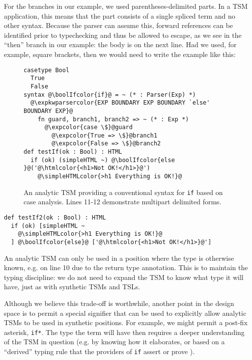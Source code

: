 \documentclass{sig-alternate}[10pt]
\newcommand{\htmlcolor}[1]{\textcolor[HTML]{339933}{#1}}
\newcommand{\expkwparsercolor}[1]{\textcolor[HTML]{336699}{#1}}
\newcommand{\expcolor}[1]{\textcolor[HTML]{FF0033}{#1}}
\newcommand{\simpleHTMLcolor}[1]{\textcolor[HTML]{7D5100}{#1}}
\newcommand{\boolIfcolor}[1]{\textcolor[HTML]{CD7300}{#1}}
\newcommand{\mycaption}[1]{\vspace{-10px}\caption{#1}\vspace{-8px}}
\newcommand{\lstinlinew}[1]{\lstinline[style=wyvern]{#1}}
\begin{document}
For the branches in our example, we used parentheses-delimited parts. In a TSM application, this means that the part consists of a single spliced term and no other syntax. Because the parser can assume this, forward references can be identified prior to typechecking and thus be allowed to escape, as we see in the ``then'' branch in our example: the body is on the next line. Had we used, for example, square brackets, then we would need to write the example like this:


\begin{figure}[t]
\begin{lstlisting}[style=wyvern]
casetype Bool
  True
  False
syntax @\boolIfcolor{if}@ = ~ (* : Parser(Exp) *)
  @\expkwparsercolor{EXP BOUNDARY EXP BOUNDARY `else' BOUNDARY EXP}@
    fn guard, branch1, branch2 => ~ (* : Exp *)
      @\expcolor{case \$}@guard
        @\expcolor{True => \$}@branch1
        @\expcolor{False => \$}@branch2
def testIf(ok : Bool) : HTML
  if (ok) (simpleHTML ~) @\boolIfcolor{else }@('@\htmlcolor{<h1>Not OK!</h1>}@')
    @\simpleHTMLcolor{>h1 Everything is OK!}@
\end{lstlisting}
\mycaption{An analytic TSM providing a conventional syntax for \texttt{if} based on case analysis. Lines 11-12 demonstrate multipart delimited forms.}
\label{if-example}
\end{figure}
\begin{lstlisting}[style=wyvern,numbers=none,frame=none]
def testIf2(ok : Bool) : HTML
  if (ok) [simpleHTML ~
    @\simpleHTMLcolor{>h1 Everything is OK!}@
  ] @\boolIfcolor{else}@ ['@\htmlcolor{<h1>Not OK!</h1>}@']
\end{lstlisting}

An analytic TSM can only be used in a position where the type is otherwise known, e.g. on line 10 due to the return type annotation. This is to maintain the typing discipline: we do not need to expand the TSM to know what type it will have, just as with synthetic TSMs and TSLs. 

Although we believe this trade-off is worthwhile, another point in the design space is to permit a special signifier that can be used to explicitly allow analytic TSMs to be used in synthetic positions. For example, we might permit a post-fix asterisk, \lstinlinew{if*}. The type the term will have then requires a deeper understanding of the TSM in question (e.g. by knowing how it elaborates, or based on a ``derived'' typing rule that the providers of \lstinlinew{if} assert or prove \cite{conf/icfp/LorenzenE13}).
\end{document}
